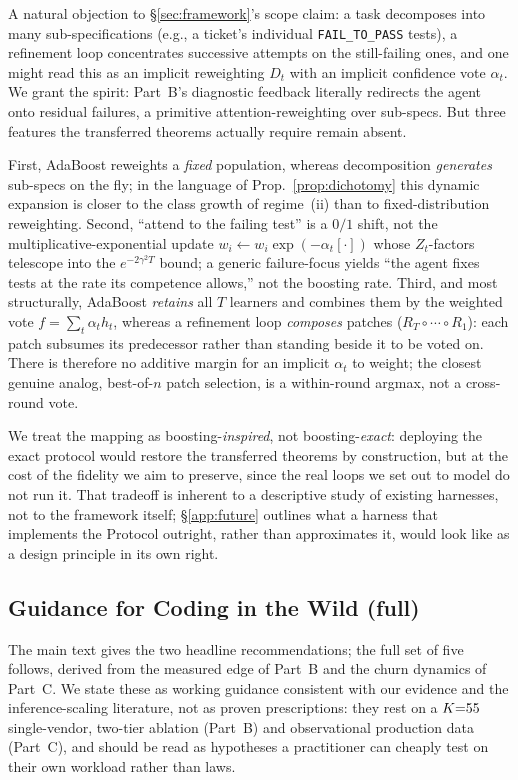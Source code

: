 A natural objection to \S\ref{sec:framework}'s scope claim: a task decomposes into many sub-specifications (e.g., a ticket's individual \texttt{FAIL\_TO\_PASS} tests), a refinement loop concentrates successive attempts on the still-failing ones, and one might read this as an implicit reweighting $D_t$ with an implicit confidence vote $\alpha_t$. We grant the spirit: Part~B's diagnostic feedback literally redirects the agent onto residual failures, a primitive attention-reweighting over sub-specs. But three features the transferred theorems actually require remain absent.

First, AdaBoost reweights a \emph{fixed} population, whereas decomposition \emph{generates} sub-specs on the fly; in the language of Prop.~\ref{prop:dichotomy} this dynamic expansion is closer to the class growth of regime~(ii) than to fixed-distribution reweighting. Second, ``attend to the failing test'' is a $0/1$ shift, not the multiplicative-exponential update $w_i\leftarrow w_i\exp(-\alpha_t[\cdot])$ whose $Z_t$-factors telescope into the $e^{-2\gamma^2T}$ bound; a generic failure-focus yields ``the agent fixes tests at the rate its competence allows,'' not the boosting rate. Third, and most structurally, AdaBoost \emph{retains} all $T$ learners and combines them by the weighted vote $f=\sum_t\alpha_t h_t$, whereas a refinement loop \emph{composes} patches ($R_T\circ\cdots\circ R_1$): each patch subsumes its predecessor rather than standing beside it to be voted on. There is therefore no additive margin for an implicit $\alpha_t$ to weight; the closest genuine analog, best-of-$n$ patch selection, is a within-round argmax, not a cross-round vote.

We treat the mapping as boosting-\emph{inspired}, not boosting-\emph{exact}: deploying the exact protocol would restore the transferred theorems by construction, but at the cost of the fidelity we aim to preserve, since the real loops we set out to model do not run it. That tradeoff is inherent to a descriptive study of existing harnesses, not to the framework itself; \S\ref{app:future} outlines what a harness that implements the Protocol outright, rather than approximates it, would look like as a design principle in its own right.

\subsection{Guidance for Coding in the Wild (full)}
\label{app:guidance}

The main text gives the two headline recommendations; the full set of five follows, derived from the measured edge of Part~B and the churn dynamics of Part~C. We state these as working guidance consistent with our evidence and the inference-scaling literature, not as proven prescriptions: they rest on a $K{=}55$ single-vendor, two-tier ablation (Part~B) and observational production data (Part~C), and should be read as hypotheses a practitioner can cheaply test on their own workload rather than laws.

